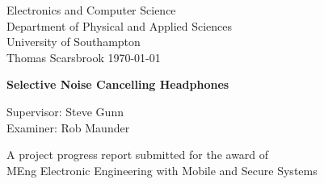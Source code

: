 \begin{titlepage}
\thispagestyle{plain}
\begin{center}

\LARGE{Electronics and Computer Science}\\
\LARGE{Department of Physical and Applied Sciences}\\
\LARGE{University of Southampton}\\
\vfill
\normalsize{Thomas Scarsbrook}
\vfill
\normalsize\today

\vfill

\Large{\textbf{Selective Noise Cancelling Headphones}}

\vfill

\normalsize{Supervisor: Steve Gunn}\\
\normalsize{Examiner: Rob Maunder}

\vfill

\large{A project progress report submitted for the award of\\
MEng Electronic Engineering with Mobile and Secure Systems}

\end{center}
\end{titlepage}
